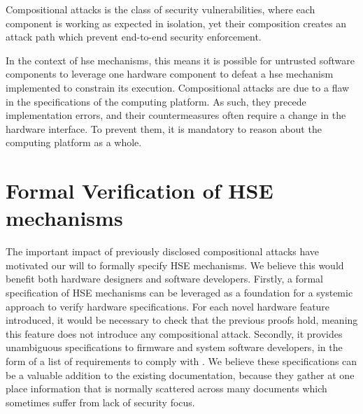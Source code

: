 \begin{definition}
  Compositional attacks is the class of security vulnerabilities, where each
  component is working as expected in isolation, yet their composition creates
  an attack path which prevent end-to-end security enforcement.
\end{definition}

In the context of \ac{hse} mechanisms, this means it is possible for untrusted
software components to leverage one hardware component to defeat a \ac{hse}
mechanism implemented to constrain its execution.
%
Compositional attacks are  due to a flaw in the specifications of the computing
platform.
%
As such, they precede implementation errors, and their countermeasures often
require a change in the hardware interface.
%
To prevent them, it is mandatory to reason about the computing platform as a
whole.

\section{Formal Verification of HSE mechanisms}
\label{sec:intro:verif}

The important impact of previously disclosed compositional attacks have
motivated our will to formally specify HSE mechanisms.
%
We believe this would benefit both hardware designers and software developers.
%
Firstly, a formal specification of HSE mechanisms can be leveraged as a
foundation for a systemic approach to verify hardware specifications.
%
For each novel hardware feature introduced, it would be necessary to check that
the previous proofs hold, meaning this feature does not introduce any
compositional attack.
%
Secondly, it provides unambiguous specifications to firmware and system software
developers, in the form of a list of requirements to comply with .
%
We believe these specifications can be a valuable addition to the existing
documentation, because they gather at one place information that is normally
scattered across many documents which sometimes suffer from lack of security
focus.

